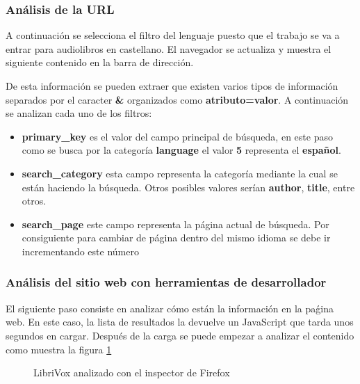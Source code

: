 \subsubsection{Análisis de la \acrshort{URL}}
A continuación se selecciona el filtro del lenguaje puesto que el trabajo se va a entrar para audiolibros en castellano. El navegador se actualiza y muestra el siguiente contenido en la barra de dirección.
\begin{center}
\end{center}
De esta información se pueden extraer que existen varios tipos de información separados por el caracter \textbf{\&} organizados como \textbf{atributo=valor}. A continuación se analizan cada uno de los filtros:
\begin{itemize}
	\item \textbf{primary\_key} es el valor del campo principal de búsqueda, en este paso como se busca por la categoría \textbf{language} el valor \textbf{5} representa el \textbf{español}.
	\item \textbf{search\_category} esta campo representa la categoría mediante la cual se están haciendo la búsqueda. Otros posibles valores serían \textbf{author}, \textbf{title}, entre otros.
	\item \textbf{search\_page} este campo representa la página actual de búsqueda. Por consiguiente para cambiar de página dentro del mismo idioma se debe ir incrementando este número
\end{itemize}
\subsubsection{Análisis del sitio web con herramientas de desarrollador}
El siguiente paso consiste en analizar cómo están la información en la paǵina web. En este caso, la lista de resultados la devuelve un JavaScript que tarda unos segundos en cargar. Después de la carga se puede empezar a analizar el contenido como muestra la figura \ref{fig: librivox_inspect}
\begin{figure}[ht!]
	\centering
	\caption{LibriVox analizado con el inspector de Firefox}
	\label{fig: librivox_inspect}
\end{figure}

